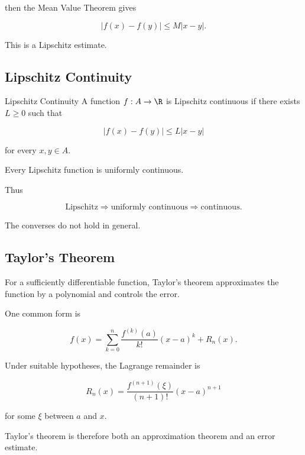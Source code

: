 then the Mean Value Theorem gives

\[
\boxed{
|f(x)-f(y)|
\leq
M|x-y|.
}
\]

This is a Lipschitz estimate.

\subsection{Lipschitz Continuity}
\label{subsec:lipschitz-continuity}

\begin{definitionbox}{Lipschitz Continuity}
A function \(f:A\to\R\) is Lipschitz continuous if there exists \(L\geq0\)
such that

\[
\boxed{
|f(x)-f(y)|
\leq
L|x-y|
}
\]

for every \(x,y\in A\).
\end{definitionbox}

Every Lipschitz function is uniformly continuous.

Thus

\[
\boxed{
\text{Lipschitz}
\Longrightarrow
\text{uniformly continuous}
\Longrightarrow
\text{continuous}.
}
\]

The converses do not hold in general.

\subsection{Taylor's Theorem}
\label{subsec:taylor-theorem-analysis}

For a sufficiently differentiable function, Taylor's theorem approximates
the function by a polynomial and controls the error.

One common form is

\[
\boxed{
f(x)
=
\sum_{k=0}^{n}
\frac{f^{(k)}(a)}{k!}(x-a)^k
+
R_n(x).
}
\]

Under suitable hypotheses, the Lagrange remainder is

\[
\boxed{
R_n(x)
=
\frac{f^{(n+1)}(\xi)}
{(n+1)!}
(x-a)^{n+1}
}
\]

for some \(\xi\) between \(a\) and \(x\).

Taylor's theorem is therefore both an approximation theorem and an error
estimate.


